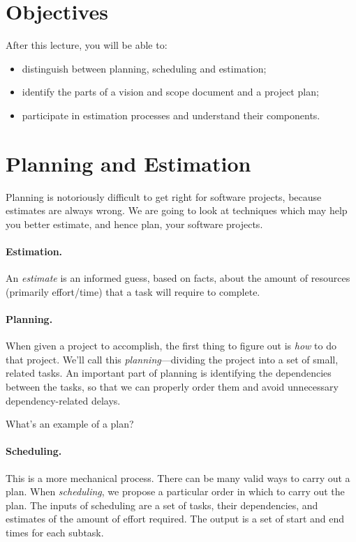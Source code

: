 





\section*{Objectives}
After this lecture, you will be able to:
\begin{itemize}
\item distinguish between planning, scheduling and estimation;
\item identify the parts of a vision and scope document and a project plan;
\item participate in estimation processes and understand their components.
\end{itemize}

\section*{Planning and Estimation}
Planning is notoriously difficult to get right for software projects,
because estimates are always wrong.  We are going to look at
techniques which may help you better estimate, and hence plan,
your software projects.

\paragraph{Estimation.} An \emph{estimate} is an informed
guess, based on facts, about the amount of resources (primarily
effort/time) that a task will require to complete.

\paragraph{Planning.} When given a project to accomplish, 
the first thing to figure out is \emph{how} to do that project. We'll
call this \emph{planning}---dividing the project into a set of small,
related tasks. An important part of planning is identifying the
dependencies between the tasks, so that we can properly order them and
avoid unnecessary dependency-related delays.

{\sf What's an example of a plan?}
\vspace{5em}

\paragraph{Scheduling.} This is a more mechanical process. There can
be many valid ways to carry out a plan. When \emph{scheduling}, we propose
a particular order in which to carry out the plan. The inputs of scheduling
are a set of tasks, their dependencies, and estimates of the amount of
effort required. The output is a set of start and end times for each
subtask.

